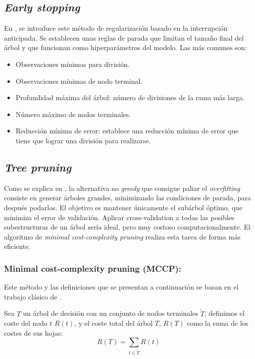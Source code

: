\documentclass[titlepage, 11pt]{book}
\begin{document}
\subsection{\textit{Early stopping}}
En \cite{CART}, se introduce este método de regularización basado en la interrupción anticipada. Se establecen unas reglas de parada que limitan el tamaño final del árbol y que funcionan como hiperparámetros del modelo. Las más comunes son:

\begin{itemize}
    \item Observaciones mínimas para división.
    \item Observaciones mínimas de nodo terminal.
    \item Profundidad máxima del árbol: número de divisiones de la rama más larga.
    \item Número máximo de nodos terminales.
    \item Reducción mínima de error: establece una reducción mínima de error que tiene que lograr una división para realizarse.
\end{itemize}


\subsection{\textit{Tree pruning}}
Como se explica en \cite{hastie2009elements}, la alternativa no \textit{greedy} que consigue paliar el \textit{overfitting} consiste en generar árboles grandes, minimizando las condiciones de parada, para después podarlos. El objetivo es mantener únicamente el subárbol óptimo, que minimiza el error de validación. Aplicar cross-validation a todas las posibles subestructuras de un árbol sería ideal, pero muy costoso computacionalmente. El algoritmo de \textit{ minimal cost-complexity pruning} realiza esta tarea de forma más eficiente.

\subsubsection*{Minimal cost-complexity pruning (MCCP):}
Este método y las definiciones que se presentan a continuación se basan en el trabajo clásico de \cite{CART}.

Sea $T$ un árbol de decisión con un conjunto de nodos terminales $\tilde{T}$, definimos el coste del nodo $t$ $R(t)$, y el coste total del árbol $T$, $R(T)$ como la suma de los costes de sus hojas:
\begin{equation*}
    R(T)=\sum_{t \in \tilde{T}}R(t)
\end{equation*}
\end{document}
